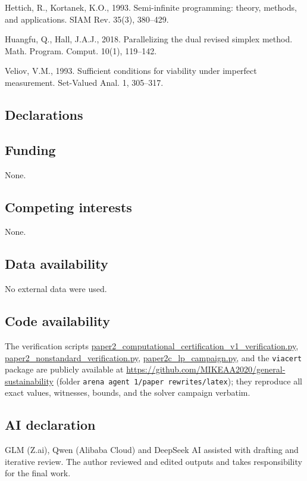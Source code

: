 \documentclass[10pt,twocolumn]{article}
\theoremstyle{plain}
\theoremstyle{definition}
\theoremstyle{remark}
\begin{document}
Hettich, R., Kortanek, K.O., 1993. Semi-infinite programming: theory,
methods, and applications. SIAM Rev. 35(3), 380--429.

Huangfu, Q., Hall, J.A.J., 2018. Parallelizing the dual revised simplex
method. Math. Program. Comput. 10(1), 119--142.

Veliov, V.M., 1993. Sufficient conditions for viability under imperfect
measurement. Set-Valued Anal. 1, 305--317.

\subsection*{Declarations}

\subsection*{Funding}
None.

\subsection*{Competing interests}
None.

\subsection*{Data availability}
No external data were used.

\subsection*{Code availability}
The verification scripts \url{paper2_computational_certification_v1_verification.py},
\url{paper2_nonstandard_verification.py},
\url{paper2c_lp_campaign.py}, and the \texttt{viacert} package are publicly
available at \url{https://github.com/MIKEAA2020/general-sustainability}
(folder \texttt{arena agent 1/paper rewrites/latex}); they reproduce all
exact values, witnesses, bounds, and the solver campaign verbatim.

\subsection*{AI declaration}
GLM (Z.ai), Qwen (Alibaba Cloud) and DeepSeek AI assisted with drafting
and iterative review. The author reviewed and edited outputs and takes
responsibility for the final work.
\end{document}
